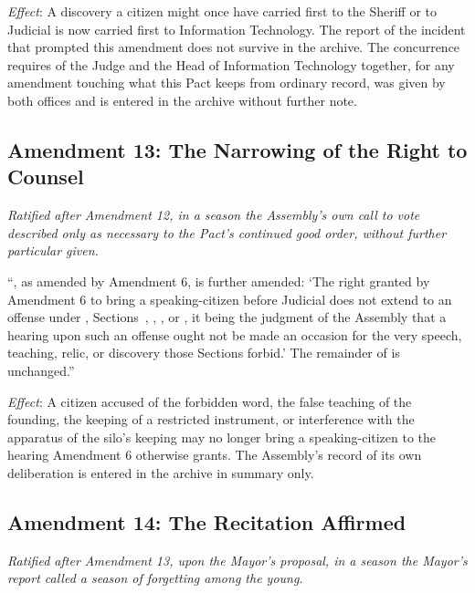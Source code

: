 \textit{Effect}: A discovery a citizen might once have carried first to the Sheriff or to Judicial is now carried first to Information Technology. The report of the incident that prompted this amendment does not survive in the archive. The concurrence  requires of the Judge and the Head of Information Technology together, for any amendment touching what this Pact keeps from ordinary record, was given by both offices and is entered in the archive without further note.

\subsection*{Amendment 13: The Narrowing of the Right to Counsel}

\textit{Ratified after Amendment 12, in a season the Assembly's own call to vote described only as necessary to the Pact's continued good order, without further particular given.}

``, as amended by Amendment 6, is further amended: `The right granted by Amendment 6 to bring a speaking-citizen before Judicial does not extend to an offense under , Sections~, , , or , it being the judgment of the Assembly that a hearing upon such an offense ought not be made an occasion for the very speech, teaching, relic, or discovery those Sections forbid.' The remainder of  is unchanged.''

\textit{Effect}: A citizen accused of the forbidden word, the false teaching of the founding, the keeping of a restricted instrument, or interference with the apparatus of the silo's keeping may no longer bring a speaking-citizen to the hearing Amendment 6 otherwise grants. The Assembly's record of its own deliberation is entered in the archive in summary only.

\subsection*{Amendment 14: The Recitation Affirmed}

\textit{Ratified after Amendment 13, upon the Mayor's proposal, in a season the Mayor's report called a season of forgetting among the young.}

